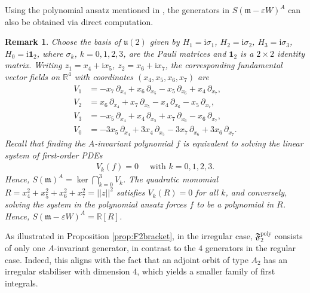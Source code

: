 \documentclass[11pt]{amsart}
\theoremstyle{definition}
\theoremstyle{plain}
\newtheorem{remark}[theorem]{Remark}
\theoremstyle{conclusion}
\begin{document}
Using the polynomial ansatz mentioned in \cite{campoamor2024superintegrable,campoamor2026construction}, the generators in $S(\mathfrak{m} - \varepsilon W)^A$ can also be obtained via direct computation.

\begin{remark}
 Choose the basis of $\mathfrak{u}(2)$ given by $H_1=\mathrm{i}\sigma_1$, $H_2=\mathrm{i}\sigma_2$, $H_3=\mathrm{i}\sigma_3$, $H_0=\mathrm{i}\textbf{1}_2$, where $\sigma_k$, $k = 0,1,2,3$, are the Pauli matrices and $\textbf{1}_2$ is a $2 \times 2$ identity matrix. Writing $z_1=x_4+\mathrm{i} x_5$, $z_2=x_6+\mathrm{i} x_7$, the corresponding fundamental vector fields on $\mathbb{R}^4$ with coordinates $(x_4,x_5,x_6,x_7)$ are \begin{align*}
V_1&=-x_7\,\partial_{x_4}+x_6\,\partial_{x_5}-x_5\,\partial_{x_6}+x_4\,\partial_{x_7},
\\
V_2&=x_6\,\partial_{x_4}+x_7\,\partial_{x_5}-x_4\,\partial_{x_6}-x_5\,\partial_{x_7},
\\
V_3&=-x_5\,\partial_{x_4}+x_4\,\partial_{x_5}+x_7\,\partial_{x_6}-x_6\,\partial_{x_7},
\\
V_0&=-3x_5\,\partial_{x_4}+3x_4\,\partial_{x_5}-3x_7\,\partial_{x_6}+3x_6\,\partial_{x_7}.
\end{align*} Recall that finding the $A$-invariant polynomial $f$ is equivalent to solving the linear system of first-order PDEs \begin{align*}
V_k(f)=0\quad \text{ with } k=0,1,2,3.
\end{align*} Hence, $S(\mathfrak{m})^A = \ker \bigcap_{k = 0}^3 V_k$. The quadratic monomial $R=x_4^2+x_5^2+x_6^2+x_7^2=|| z||^2$ satisfies $V_k(R)=0$ for all $k$, and conversely, solving the system in the polynomial ansatz forces $f$ to be a polynomial in $R$. Hence, $S(\mathfrak{m}-\varepsilon W)^A=\mathbb{R}[R]$.
\end{remark}

 As illustrated in Proposition \ref{prop:F2bracket}, in the irregular case, $\mathfrak{F}_2^{\mathrm{poly}}$ consists of only one $A$-invariant generator, in contrast to the $4$ generators in the regular case. Indeed, this aligns with the fact that an adjoint orbit of type $A_2$ has an irregular stabiliser with dimension $4$, which yields a smaller family of first integrals.  

\end{document}
